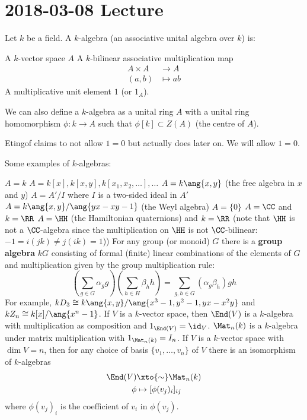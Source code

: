 \section{2018-03-08 Lecture}

\begin{defn}
	Let $k$ be a field.
	A $k$-algebra (an associative unital algebra over $k$) is:
	\begin{itm}
		\io A $k$-vector space $A$
		\io A $k$-bilinear associative multiplication map
			\begin{align*}
				A \times A &\to A \\
				(a,b) &\mapsto ab
			\end{align*}
		\io A multiplicative unit element $1$ (or $1_A$).
	\end{itm}
\end{defn}

\begin{rmk}
	We can also define a $k$-algebra as a unital ring $A$ with a unital ring homomorphism $\phi: k \to A$ such that $\phi[k] \subset Z(A)$ (the centre of $A$).
\end{rmk}

\begin{rmk}
	Etingof claims to not allow $1=0$ but actually does later on.
	We will allow $1=0$.
\end{rmk}

\begin{exam}
	Some examples of $k$-algebras:
	\begin{enum}
		\io $A=k$
		\io $A=k[x],k[x,y],k[x_1,x_2,\ldots],\ldots$
		\io $A=k\ang{x,y}$ (the free algebra in $x$ and $y$)
		\io $A=A'/I$ where $I$ is a two-sided ideal in $A'$
		\io $A=k\ang{x,y}/\ang{yx-xy-1}$ (the Weyl algebra)
		\io $A=\{0\}$
		\io $A=\CC$ and $k=\RR$
		\io $A=\HH$ (the Hamiltonian quaternions) and $k=\RR$ (note that $\HH$ is not a $\CC$-algebra since the multiplication on $\HH$ is not $\CC$-bilinear: $-1=i(jk)\neq j(ik)=1$))
		\io For any group (or monoid) $G$ there is a \textbf{group algebra} $kG$ consisting of formal (finite) linear combinations of the elements of $G$ and multiplication given by the group multiplication rule:
		\[\left(\sum_{g\in G}\alpha_gg\right)\left(\sum_{h\in H}\beta_hh\right)=\sum_{g,h\in G}(\alpha_g\beta_h)gh\]
		For example, $kD_3\cong k\ang{x,y}/\ang{x^3-1,y^2-1,yx-x^2y}$ and $kZ_n\cong k[x]/\ang{x^n-1}$.
		\io If $V$ is a $k$-vector space, then $\End(V)$ is a $k$-algebra with multiplication as composition and $1_{\End(V)}=\id_V$.
		\io $\Mat_n(k)$ is a $k$-algebra under matrix multiplication with $1_{\Mat_n(k)}=I_n$.
		If $V$ is a $k$-vector space with $\dim V=n$, then for any choice of basis $\{v_1,\ldots,v_n\}$ of $V$ there is an isomorphism of $k$-algebras
		\begin{align*}
			\End(V) &\xto{\sim} \Mat_n(k) \\
			\phi &\mapsto [\phi(v_j)_i]_{ij}
		\end{align*}
		where $\phi(v_j)_i$ is the coefficient of $v_i$ in $\phi(v_j)$.
	\end{enum}
\end{exam}

